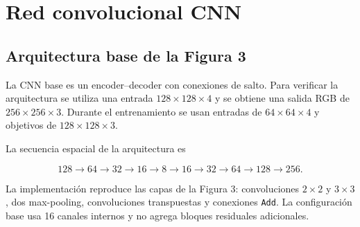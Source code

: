 \documentclass[11pt,a4paper]{article}
\begin{document}
\section{Red convolucional CNN}

\subsection{Arquitectura base de la Figura 3}

La CNN base es un encoder--decoder con conexiones de salto. Para verificar la arquitectura se utiliza una entrada $128\times128\times4$ y se obtiene una salida RGB de $256\times256\times3$. Durante el entrenamiento se usan entradas de $64\times64\times4$ y objetivos de $128\times128\times3$.

La secuencia espacial de la arquitectura es

\begin{equation}
    128\to64\to32\to16\to8\to16\to32\to64\to128\to256.
    \label{eq:cnn-scales}
\end{equation}

La implementación reproduce las capas de la Figura 3: convoluciones $2\times2$ y $3\times3$, dos max-pooling, convoluciones transpuestas y conexiones \texttt{Add}. La configuración base usa 16 canales internos y no agrega bloques residuales adicionales.
\end{document}
